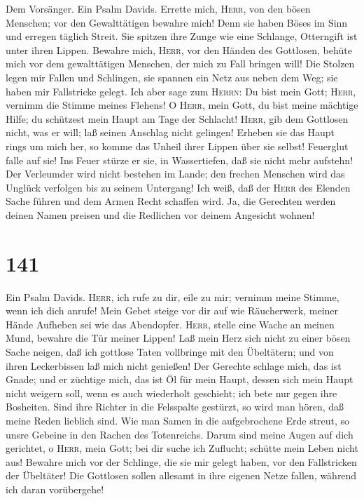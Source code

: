  Dem Vorsänger. Ein Psalm Davids. Errette mich,
\textsc{Herr}, von den bösen Menschen; vor den Gewalttätigen bewahre
mich!  Denn sie haben Böses im Sinn und erregen täglich
Streit.  Sie spitzen ihre Zunge wie eine Schlange,
Otterngift ist unter ihren Lippen.  Bewahre mich,
\textsc{Herr}, vor den Händen des Gottlosen, behüte mich vor dem
gewalttätigen Menschen, der mich zu Fall bringen will! 
Die Stolzen legen mir Fallen und Schlingen, sie spannen ein Netz aus
neben dem Weg; sie haben mir Fallstricke gelegt.  Ich aber
sage zum \textsc{Herrn}: Du bist mein Gott; \textsc{Herr}, vernimm die
Stimme meines Flehens!  O \textsc{Herr}, mein Gott, du
bist meine mächtige Hilfe; du schützest mein Haupt am Tage der Schlacht!
 \textsc{Herr}, gib dem Gottlosen nicht, was er will; laß
seinen Anschlag nicht gelingen!  Erheben sie das Haupt
rings um mich her, so komme das Unheil ihrer Lippen über sie selbst!
 Feuerglut falle auf sie! Ins Feuer stürze er sie, in
Wassertiefen, daß sie nicht mehr aufstehn!  Der
Verleumder wird nicht bestehen im Lande; den frechen Menschen wird das
Unglück verfolgen bis zu seinem Untergang!  Ich weiß, daß
der \textsc{Herr} des Elenden Sache führen und dem Armen Recht schaffen
wird.  Ja, die Gerechten werden deinen Namen preisen und
die Redlichen vor deinem Angesicht wohnen!

\hypertarget{section-140}{%
\section{141}\label{section-140}}

 Ein Psalm Davids. \textsc{Herr}, ich rufe zu dir, eile zu
mir; vernimm meine Stimme, wenn ich dich anrufe!  Mein
Gebet steige vor dir auf wie Räucherwerk, meiner Hände Aufheben sei wie
das Abendopfer.  \textsc{Herr}, stelle eine Wache an
meinen Mund, bewahre die Tür meiner Lippen!  Laß mein Herz
sich nicht zu einer bösen Sache neigen, daß ich gottlose Taten
vollbringe mit den Übeltätern; und von ihren Leckerbissen laß mich nicht
genießen!  Der Gerechte schlage mich, das ist Gnade; und
er züchtige mich, das ist Öl für mein Haupt, dessen sich mein Haupt
nicht weigern soll, wenn es auch wiederholt geschieht; ich bete nur
gegen ihre Bosheiten.  Sind ihre Richter in die Felsspalte
gestürzt, so wird man hören, daß meine Reden lieblich sind.
 Wie man Samen in die aufgebrochene Erde streut, so unsre
Gebeine in den Rachen des Totenreichs.  Darum sind meine
Augen auf dich gerichtet, o \textsc{Herr}, mein Gott; bei dir suche ich
Zuflucht; schütte mein Leben nicht aus!  Bewahre mich vor
der Schlinge, die sie mir gelegt haben, vor den Fallstricken der
Übeltäter!  Die Gottlosen sollen allesamt in ihre eigenen
Netze fallen, während ich daran vorübergehe!

